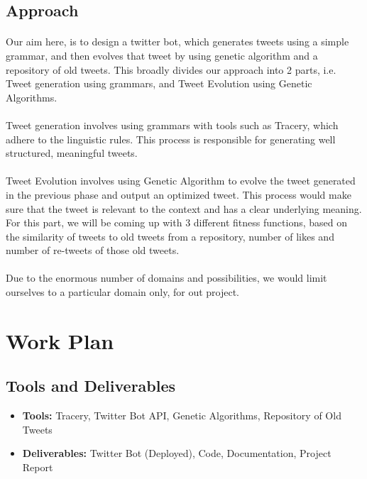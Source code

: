 \documentclass[11pt]{article}
\begin{document}
        \subsection{Approach}
        \paragraph{}
        Our aim here, is to design a twitter bot, which generates tweets using a simple grammar, and then evolves that tweet by using genetic algorithm and a repository of old tweets. This broadly divides our approach into 2 parts, i.e. Tweet generation using grammars, and Tweet Evolution using Genetic Algorithms. 
        \paragraph{}
        Tweet generation involves using grammars with tools such as Tracery, which adhere to the linguistic rules. This process is responsible for generating well structured, meaningful tweets.
        \paragraph{}
        Tweet Evolution involves using Genetic Algorithm to evolve the tweet generated in the previous phase and output an optimized tweet. This process would make sure that the tweet is relevant to the context and has a clear underlying meaning. For this part, we will be coming up with 3 different fitness functions, based on the similarity of tweets to old tweets from a repository, number of likes and number of re-tweets of those old tweets.
        \paragraph{}
        Due to the enormous number of domains and possibilities, we would limit ourselves to a particular domain only, for out project.

    \section{Work Plan}
        \subsection{Tools and Deliverables}
        \begin{itemize}
            \item \textbf{Tools:} Tracery, Twitter Bot API, Genetic Algorithms, Repository of Old Tweets 
            \item \textbf{Deliverables:} Twitter Bot (Deployed), Code, Documentation, Project Report
        \end{itemize}
\end{document}
